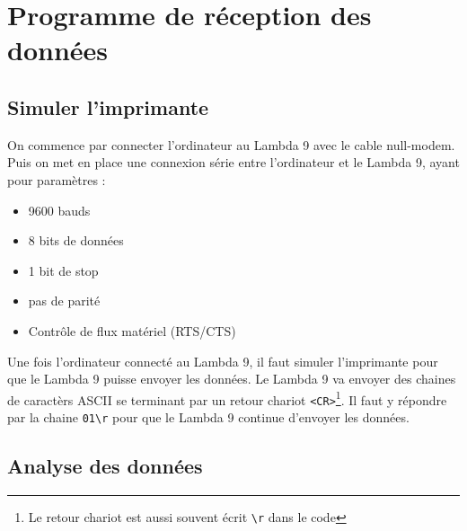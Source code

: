 \documentclass[a4paper, 12pt]{article}
\begin{document}
\newpage
\section{Programme de réception des données}\label{programme}
\subsection{Simuler l'imprimante}\label{simuler}

On commence par connecter l'ordinateur au Lambda 9 avec le cable null-modem.
Puis on met en place une connexion série entre l'ordinateur et le Lambda 9, ayant pour paramètres :
\begin{itemize}
	\item 9600 bauds
	\item 8 bits de données
	\item 1 bit de stop
	\item pas de parité
	\item Contrôle de flux matériel (RTS/CTS)
\end{itemize}

Une fois l'ordinateur connecté au Lambda 9, il faut simuler l'imprimante pour que le Lambda 9 puisse envoyer les données.
Le Lambda 9 va envoyer des chaines de caractèrs ASCII se terminant par un retour chariot \texttt{<CR>}\footnote{Le retour chariot est aussi souvent écrit \texttt{\textbackslash r} dans le code}.
Il faut y répondre par la chaine \verb|01\r| pour que le Lambda 9 continue d'envoyer les données.

\subsection{Analyse des données}\label{analyse}
\end{document}
